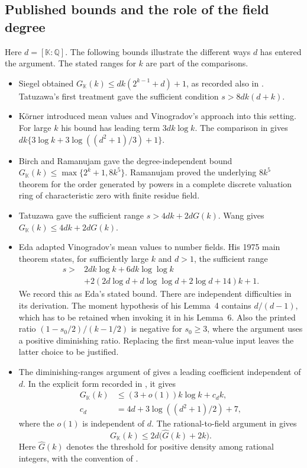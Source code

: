\documentclass[11pt,letterpaper]{article}
\theoremstyle{definition}
\numberwithin{equation}{section}
\begin{document}
\subsection{Published bounds and the role of the field degree}
Here $d=[\mathbb K:\mathbb Q]$. The following bounds illustrate the
different ways $d$ has entered the argument. The stated ranges for $k$
are part of the comparisons.
\begin{itemize}
\item Siegel \cite{hsieg44,hsieg45} obtained
$G_{\mathbb K}(k)\le dk(2^{k-1}+d)+1$, as recorded also in
\cite[\S16]{hvw}. Tatuzawa's first treatment \cite{htat58}
gave the sufficient condition $s>8dk(d+k)$.
\item K\"orner \cite{hkorn61,hkorn62} introduced mean values and
Vinogradov's approach into this setting. For large $k$ his bound has
leading term $3dk\log k$. The comparison in \cite[p.~31]{heda75}
gives $dk\{3\log k+3\log((d^2+1)/3)+1\}$.
\item Birch \cite{hbirch61} and Ramanujam \cite{hram63} gave the
degree-independent bound
$G_{\mathbb K}(k)\le\max\{2^k+1,8k^5\}$.
Ramanujam proved the underlying $8k^5$ theorem for the order
generated by powers in a complete discrete valuation ring of
characteristic zero with finite residue field.
\item Tatuzawa \cite[Theorem~5]{htat73} gave the sufficient range
$s>4dk+2dG(k)$. Wang \cite[Theorem~7.3]{hwang} gives
$G_{\mathbb K}(k)\le 4dk+2dG(k)$.
\item Eda \cite{heda67,heda75} adapted Vinogradov's mean values to
number fields. His 1975 main theorem states,
for sufficiently large $k$ and $d>1$, the sufficient range
\begin{align*}
s>{}& 2dk\log k+6dk\log\log k\\
   &+2(2d\log d+d\log\log d+2\log d+14)k+1 .
\end{align*}
We record this as Eda's stated bound. There are independent difficulties
in its derivation. The moment hypothesis of his Lemma~4 contains
$d/(d-1)$, which has to be retained when invoking it in his Lemma~6.
Also the printed ratio $(1-s_0/2)/(k-1/2)$ is negative for $s_0\ge3$,
where the argument uses a positive diminishing ratio. Replacing the
first mean-value input leaves the latter choice to be justified.
\item The diminishing-ranges argument of \cite{hdav98} gives a leading
coefficient independent of $d$. In the explicit form recorded in
\cite[\S16]{hvw}, it gives
\begin{align}
 G_{\mathbb K}(k)&\le (3+o(1))k\log k+c_d k,\label{eq:hdav98}\\
 c_d&=4d+3\log((d^2+1)/2)+7,\nonumber
\end{align}
where the $o(1)$ is independent of $d$. The rational-to-field argument
in \cite{hdav99} gives
\[
 G_{\mathbb K}(k)\le 2d\bigl(\widehat G(k)+2k\bigr).
\]
Here $\widehat G(k)$ denotes the threshold for positive density among
rational integers, with the convention of \cite{hdav99,hvw}.
\end{itemize}
\end{document}
